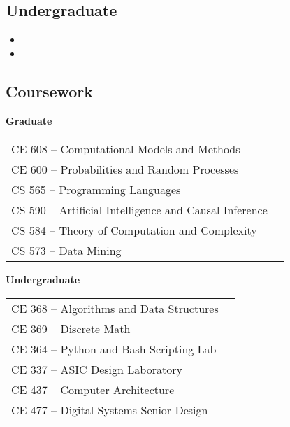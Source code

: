 \documentclass[10pt,a4paper,sans]{moderncv}        %
\begin{document}
\subsection{Undergraduate}

\vspace{3pt}

\begin{itemize}

\item{}

\item{}  %

\end{itemize}

\vspace{2pt}

\subsection{Coursework}

\begin{minipage}[t]{0.45\linewidth}
  \raggedright
  \textbf{Graduate}
  \begin{tabular}{ll}
    CE 608 -- Computational Models and Methods \\
    CE 600 -- Probabilities and Random Processes \\
    CS 565 -- Programming Languages \\
    CS 590 -- Artificial Intelligence and Causal Inference \\
    CS 584 -- Theory of Computation and Complexity \\
    CS 573 -- Data Mining \\
  \end{tabular}
\end{minipage}
\hfill
\begin{minipage}[t]{0.45\linewidth}
  \raggedright
  \textbf{Undergraduate}
  \begin{tabular}{ll}
    CE 368 -- Algorithms and Data Structures \\
    CE 369 -- Discrete Math \\
    CE 364 -- Python and Bash Scripting Lab \\
    CE 337 -- ASIC Design Laboratory \\
    CE 437 -- Computer Architecture \\
    CE 477 -- Digital Systems Senior Design \\
  \end{tabular}
\end{minipage}
\end{document}
